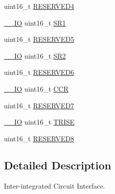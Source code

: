 \begin{DoxyCompactItemize}
\item 
uint16\-\_\-t \hyperlink{struct_i2_c___type_def_aa0223808025f5bf9c056185038c9d545}{R\-E\-S\-E\-R\-V\-E\-D4}
\item 
\hyperlink{group___c_m_s_i_s__core__definitions_gaec43007d9998a0a0e01faede4133d6be}{\-\_\-\-\_\-\-I\-O} uint16\-\_\-t \hyperlink{struct_i2_c___type_def_a1e79a16729e8d1032d9fe552d50dce41}{S\-R1}
\item 
uint16\-\_\-t \hyperlink{struct_i2_c___type_def_abd36010ac282682d1f3c641b183b1b6f}{R\-E\-S\-E\-R\-V\-E\-D5}
\item 
\hyperlink{group___c_m_s_i_s__core__definitions_gaec43007d9998a0a0e01faede4133d6be}{\-\_\-\-\_\-\-I\-O} uint16\-\_\-t \hyperlink{struct_i2_c___type_def_a682809d3f8187cdefb9d615e89b67e65}{S\-R2}
\item 
uint16\-\_\-t \hyperlink{struct_i2_c___type_def_aab502dde158ab7da8e7823d1f8a06edb}{R\-E\-S\-E\-R\-V\-E\-D6}
\item 
\hyperlink{group___c_m_s_i_s__core__definitions_gaec43007d9998a0a0e01faede4133d6be}{\-\_\-\-\_\-\-I\-O} uint16\-\_\-t \hyperlink{struct_i2_c___type_def_a7ac198788f460fa6379bceecab79c5f7}{C\-C\-R}
\item 
uint16\-\_\-t \hyperlink{struct_i2_c___type_def_ab1820c97e368d349f5f4121f015d9fab}{R\-E\-S\-E\-R\-V\-E\-D7}
\item 
\hyperlink{group___c_m_s_i_s__core__definitions_gaec43007d9998a0a0e01faede4133d6be}{\-\_\-\-\_\-\-I\-O} uint16\-\_\-t \hyperlink{struct_i2_c___type_def_a7fbb70132ee565bb179078b6ee20cc2b}{T\-R\-I\-S\-E}
\item 
uint16\-\_\-t \hyperlink{struct_i2_c___type_def_afc22764fbf9ee7ce28174d65d0260f18}{R\-E\-S\-E\-R\-V\-E\-D8}
\end{DoxyCompactItemize}


\subsection{Detailed Description}
Inter-\/integrated Circuit Interface. 

